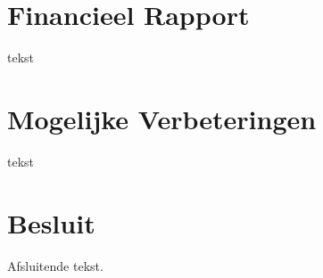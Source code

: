 \documentclass[kulak]{kulakarticle} %
\begin{document}
	\section{Financieel Rapport}
	
	tekst
	
	
	
	\section{Mogelijke Verbeteringen}
	
	tekst
	
	
	
	\section*{Besluit}
	
	Afsluitende tekst.
	
	
	
	
	
	
	
	
\end{document}
